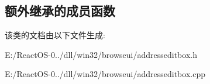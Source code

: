\subsection*{额外继承的成员函数}


该类的文档由以下文件生成\+:\begin{DoxyCompactItemize}
\item 
E\+:/\+React\+O\+S-\/0../dll/win32/browseui/addresseditbox.\+h\item 
E\+:/\+React\+O\+S-\/0../dll/win32/browseui/addresseditbox.\+cpp\end{DoxyCompactItemize}
